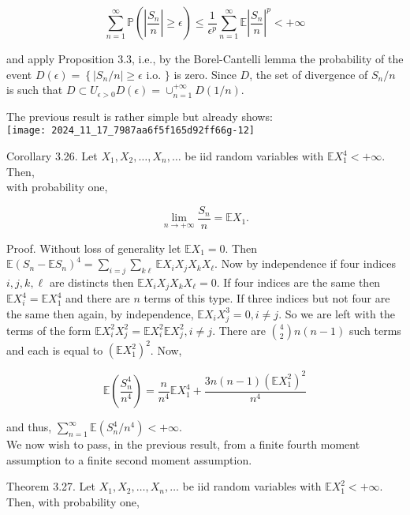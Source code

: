 \documentclass[11pt]{amsbook}
\theoremstyle{plain}%
\theoremstyle{definition}
\theoremstyle{remark}
\begin{document}
$$
\sum_{n=1}^{\infty} \mathbb{P}\left(\left|\frac{S_{n}}{n}\right| \geq \epsilon\right) \leq \frac{1}{\epsilon^{p}} \sum_{n=1}^{\infty} \mathbb{E}\left|\frac{S_{n}}{n}\right|^{p}<+\infty
$$

and apply Proposition 3.3, i.e., by the Borel-Cantelli lemma the probability of the event $D(\epsilon)=\left\{\left|S_{n} / n\right| \geq \epsilon\right.$ i.o. $\}$ is zero. Since $D$, the set of divergence of $S_{n} / n$ is such that $D \subset U_{\epsilon>0} D(\epsilon)=\cup_{n=1}^{+\infty} D(1 / n)$.

The previous result is rather simple but already shows:\\
\texttt{[image: 2024\_11\_17\_7987aa6f5f165d92ff66g-12]}

Corollary 3.26. Let $X_{1}, X_{2}, \ldots, X_{n}, \ldots$ be iid random variables with $\mathbb{E} X_{1}^{4}<+\infty$. Then,\\
with probability one,

$$
\lim _{n \rightarrow+\infty} \frac{S_{n}}{n}=\mathbb{E} X_{1} .
$$

Proof. Without loss of generality let $\mathbb{E} X_{1}=0$. Then $\mathbb{E}\left(S_{n}-\mathbb{E} S_{n}\right)^{4}=\sum_{i=j} \sum_{k \ell} \mathbb{E} X_{i} X_{j} X_{k} X_{\ell}$. Now by independence if four indices $i, j, k, \ell$ are distincts then $\mathbb{E} X_{i} X_{j} X_{k} X_{\ell}=0$. If four indices are the same then $\mathbb{E} X_{i}^{4}=\mathbb{E} X_{1}^{4}$ and there are $n$ terms of this type. If three indices but not four are the same then again, by independence, $\mathbb{E} X_{i} X_{j}^{3}=0, i \neq j$. So we are left with the terms of the form $\mathbb{E} X_{i}^{2} X_{j}^{2}=\mathbb{E} X_{i}^{2} \mathbb{E} X_{j}^{2}, i \neq j$. There are $\binom{4}{2} n(n-1)$ such terms and each is equal to $\left(\mathbb{E} X_{1}^{2}\right)^{2}$. Now,

$$
\mathbb{E}\left(\frac{S_{n}^{4}}{n^{4}}\right)=\frac{n}{n^{4}} \mathbb{E} X_{1}^{4}+\frac{3 n(n-1)\left(\mathbb{E} X_{1}^{2}\right)^{2}}{n^{4}}
$$

and thus, $\sum_{n=1}^{\infty} \mathbb{E}\left(S_{n}^{4} / n^{4}\right)<+\infty$.\\
We now wish to pass, in the previous result, from a finite fourth moment assumption to a finite second moment assumption.

Theorem 3.27. Let $X_{1}, X_{2}, \ldots, X_{n}, \ldots$ be iid random variables with $\mathbb{E} X_{1}^{2}<+\infty$. Then, with probability one,
\end{document}
